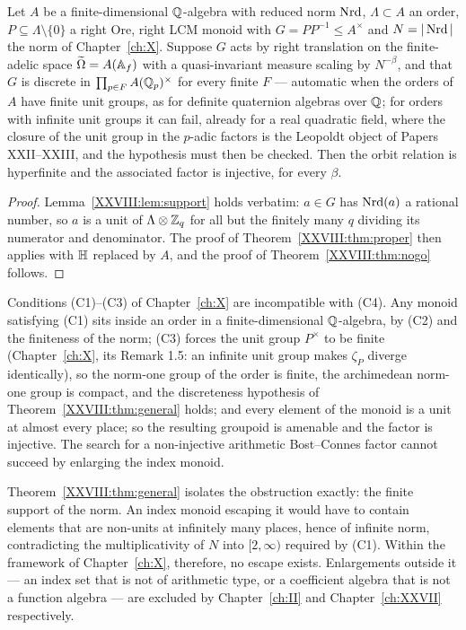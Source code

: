 \begin{theorem}[General no-go]\label{XXVIII:thm:general}
Let $A$ be a finite-dimensional $\mathbb{Q}$-algebra with reduced norm $\operatorname{Nrd}$, $\Lambda\subset A$ an
order, $P\subseteq\Lambda\setminus\{0\}$ a right Ore, right LCM monoid with $G=PP^{-1}\le A^\times$
and $N=|\operatorname{Nrd}|$ the norm of Chapter~\ref{ch:X}. Suppose $G$ acts by right translation on the finite-adelic
space $\widetilde\Omega=A(\mathbb{A}_f)$ with a quasi-invariant measure scaling by $N^{-\beta}$, and that
$G$ is discrete in $\prod_{p\in F}A(\mathbb{Q}_p)^\times$ for every finite $F$ --- automatic when
the orders of $A$ have finite unit groups, as for definite quaternion algebras over $\mathbb{Q}$;
for orders with infinite unit groups it can fail, already for a real quadratic field, where
the closure of the unit group in the $p$-adic factors is the Leopoldt object of Papers
XXII--XXIII, and the hypothesis must then be checked. Then the
orbit relation is hyperfinite and the associated factor is injective, for every $\beta$.
\end{theorem}

\begin{proof}
Lemma~\ref{XXVIII:lem:support} holds verbatim: $a\in G$ has $\operatorname{Nrd}(a)$ a rational number, so $a$ is a unit
of $\Lambda\otimes\mathbb{Z}_q$ for all but the finitely many $q$ dividing its numerator and denominator.
The proof of Theorem~\ref{XXVIII:thm:proper} then applies with $\mathbb{H}$ replaced by $A$, and the proof of
Theorem~\ref{XXVIII:thm:nogo} follows.
\end{proof}

\begin{corollary}\label{XXVIII:cor:closed}
Conditions (C1)--(C3) of Chapter~\ref{ch:X} are incompatible with (C4). Any monoid satisfying (C1) sits inside
an order in a finite-dimensional $\mathbb{Q}$-algebra, by (C2) and the finiteness of the norm; (C3)
forces the unit group $P^\times$ to be finite (Chapter~\ref{ch:X}, its Remark 1.5: an infinite unit
group makes $\zeta_P$ diverge identically), so the norm-one group of the order is finite,
the archimedean norm-one group is compact, and the discreteness hypothesis of
Theorem~\ref{XXVIII:thm:general} holds; and every
element of the monoid is a unit at almost every place; so the resulting groupoid is amenable and the factor
is injective. The search for a non-injective arithmetic Bost--Connes factor cannot succeed by
enlarging the index monoid.
\end{corollary}

\begin{remark}\label{XXVIII:rem:escape}
Theorem~\ref{XXVIII:thm:general} isolates the obstruction exactly: the finite support of the norm. An
index monoid escaping it would have to contain elements that are non-units at infinitely many
places, hence of infinite norm, contradicting the multiplicativity of $N$ into $[2,\infty)$
required by (C1). Within the framework of Chapter~\ref{ch:X}, therefore, no escape exists. Enlargements
outside it --- an index set that is not of arithmetic type, or a coefficient algebra that is not a
function algebra --- are excluded by Chapter~\ref{ch:II} and Chapter~\ref{ch:XXVII} respectively.
\end{remark}

